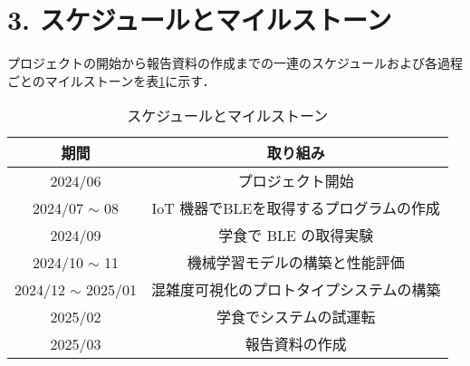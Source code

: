 \section*{3. スケジュールとマイルストーン}

プロジェクトの開始から報告資料の作成までの一連のスケジュールおよび各過程ごとのマイルストーンを表\ref{tbl:スケジュールとマイルストーン}に示す．

\begin{table}[H]
	\centering
	\caption{スケジュールとマイルストーン}
	\label{tbl:スケジュールとマイルストーン}
	\begin{tabular}{cc} \hline
		期間 & 取り組み　\\ \hline
		2024/06 & プロジェクト開始\\
		2024/07 $\sim$ 08 & IoT 機器でBLEを取得するプログラムの作成\\
		2024/09 & 学食で BLE の取得実験\\
		2024/10 $\sim$ 11 & 機械学習モデルの構築と性能評価\\
		2024/12 $\sim$ 2025/01 & 混雑度可視化のプロトタイプシステムの構築\\ 
		2025/02 & 学食でシステムの試運転\\
		2025/03 & 報告資料の作成\\ \hline
	\end{tabular}
\end{table}